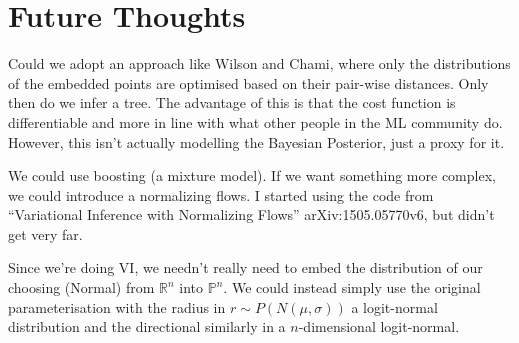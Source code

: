\documentclass[11pt]{article}
\begin{document}
\section{Future Thoughts}
Could we adopt an approach like Wilson and Chami, where only the distributions of the embedded points are optimised based on their pair-wise distances.
Only then do we infer a tree.
The advantage of this is that the cost function is differentiable and more in line with what other people in the ML community do.
However, this isn't actually modelling the Bayesian Posterior, just a proxy for it.

We could use boosting (a mixture model).
If we want something more complex, we could introduce a normalizing flows.
I started using the code from ``Variational Inference with Normalizing Flows'' arXiv:1505.05770v6, but didn't get very far.

Since we're doing VI, we needn't really need to embed the distribution of our choosing (Normal) from $\mathbb{R}^{n}$ into $\mathbb{P}^{n}$.
We could instead simply use the original parameterisation with the radius in $r \sim P(N(\mu, \sigma))$ a logit-normal distribution and the directional similarly in a $n$-dimensional logit-normal.
\end{document}
